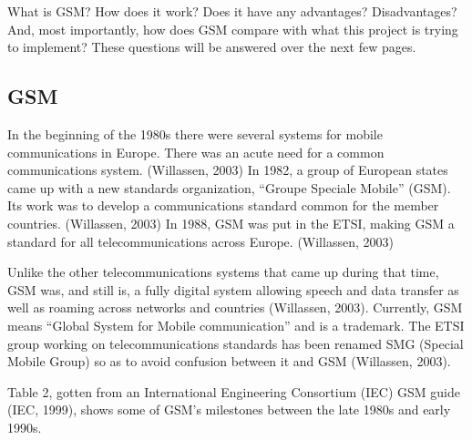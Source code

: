 \documentclass[12pt,svgnames,smaller]{article} %
\begin{document}
	What is GSM? How does it work? Does it have any advantages? Disadvantages? And, most importantly, how does GSM compare with what this project is trying to implement? These questions will be answered over the next few pages.
	
	\subsection{\textbf{GSM}}

	In the beginning of the 1980s there were several systems for mobile communications in Europe. There was an acute need for a common communications system. (Willassen, 2003) In 1982, a group of European states came up with a new standards organization, “Groupe Speciale Mobile” (GSM). Its work was to develop a communications standard common for the member countries. (Willassen, 2003) In 1988, GSM was put in the ETSI, making GSM a standard for all telecommunications across Europe. (Willassen, 2003)

	Unlike the other telecommunications systems that came up during that time, GSM was, and still is, a fully digital system allowing speech and data transfer as well as roaming across networks and countries (Willassen, 2003). Currently, GSM means “Global System for Mobile communication” and is a trademark. The ETSI group working on telecommunications standards has been renamed SMG (Special Mobile Group) so as to avoid confusion between it and GSM (Willassen, 2003).

	Table 2, gotten from an International Engineering Consortium (IEC) GSM guide (IEC, 1999), shows some of GSM’s milestones between the late 1980s and early 1990s.
\end{document}
